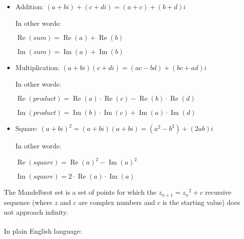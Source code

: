 \begin{itemize}
\item Addition: $(a+bi) + (c+di) = (a+c) + (b+d)i$

In other words:

$\operatorname{Re}(sum) = \operatorname{Re}(a) + \operatorname{Re}(b)$

$\operatorname{Im}(sum) = \operatorname{Im}(a) + \operatorname{Im}(b)$

\item Multiplication: $(a+bi) (c+di) = (ac-bd) + (bc+ad)i$

In other words:

$\operatorname{Re}(product) = \operatorname{Re}(a) \cdot \operatorname{Re}(c) - \operatorname{Re}(b) \cdot \operatorname{Re}(d)$

$\operatorname{Im}(product) = \operatorname{Im}(b) \cdot \operatorname{Im}(c) + \operatorname{Im}(a) \cdot \operatorname{Im}(d)$

\item Square: $(a+bi)^2 = (a+bi) (a+bi) = (a^2-b^2) + (2ab)i$

In other words:

$\operatorname{Re}(square) = \operatorname{Re}(a)^2-\operatorname{Im}(a)^2$

$\operatorname{Im}(square) = 2 \cdot \operatorname{Re}(a) \cdot \operatorname{Im}(a)$

\end{itemize}


The Mandelbrot set is a set of points for which the $z_{n+1} = {z_n}^2 + c$ recursive sequence
(where $z$ and $c$ are complex numbers and $c$ 
is the starting value)
does not approach infinity.\\
\\
In plain English language: 

